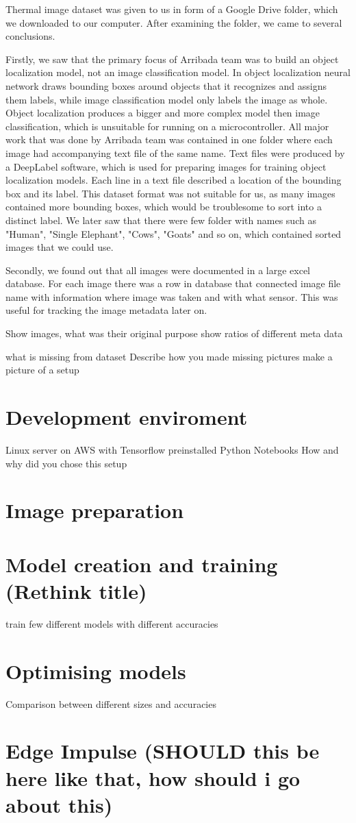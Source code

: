 Thermal image dataset was given to us in form of a Google Drive folder, which we downloaded to our computer.
After examining the folder, we came to several conclusions.

Firstly, we saw that the primary focus of Arribada team was to build an object localization model, not an image classification model.
In object localization neural network draws bounding boxes around objects that it recognizes and assigns them labels, while image classification model only labels the image as whole.
Object localization produces a bigger and more complex model then image classification, which is unsuitable for running on a microcontroller.
All major work that was done by Arribada team was contained in one folder where each image had accompanying text file of the same name.
Text files were produced by a DeepLabel software, which is used for preparing images for training object localization models.
Each line in a text file described a location of the bounding box and its label.
This dataset format was not suitable for us, as many images contained more bounding boxes, which would be troublesome to sort into a distinct label.
We later saw that there were few folder with names such as "Human", "Single Elephant", "Cows", "Goats" and so on, which contained sorted images that we could use.

Secondly, we found out that all images were documented in a large excel database.
For each image there was a row in database that connected image file name with information where image was taken and with what sensor.
This was useful for tracking the image metadata later on.


Show images, 
what was their original purpose
show ratios of different meta data

what is missing from dataset
Describe how you made missing pictures
make a picture of a setup

\section{ Development enviroment }
Linux server on AWS with Tensorflow preinstalled
Python Notebooks
How and why did you chose this setup
\section{ Image preparation}

\section{ Model creation and training (Rethink title)}
train few different models
with different accuracies

\section{ Optimising models}
Comparison between different sizes and accuracies

\section{ Edge Impulse (SHOULD this be here like that, how should i go about this)}
